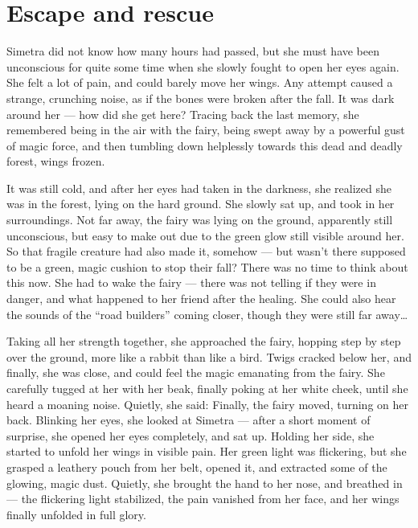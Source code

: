 \chapter{Escape and rescue}
\label{cha:escape-rescue}
Simetra did not know how many hours had passed, but she must have been unconscious for quite some time when she slowly fought to open her eyes again.
She felt a lot of pain, and could barely move her wings. Any attempt caused a strange, crunching noise, as if the bones were broken after the fall. It was dark around her --- how did she get here? Tracing back the last memory, she remembered being in the air with the fairy, being swept away by a powerful gust of magic force, and then tumbling down helplessly towards this dead and deadly forest, wings frozen.

It was still cold, and after her eyes had taken in the darkness, she realized she was in the forest, lying on the hard ground. She slowly sat up, and took in her surroundings. Not far away, the fairy was lying on the ground, apparently still unconscious, but easy to make out due to the green glow still visible around her. So that fragile creature had also made it, somehow --- but wasn't there supposed to be a green, magic cushion to stop their fall?
There was no time to think about this now. She had to wake the fairy --- there was not telling if they were in danger, and what happened to her friend after the healing. She could also hear the sounds of the \enquote{road builders} coming closer, though they were still far away\dots{}

Taking all her strength together, she approached the fairy, hopping step by step over the ground, more like a rabbit than like a bird. Twigs cracked below her, and finally, she was close, and could feel the magic emanating from the fairy. She carefully tugged at her with her beak, finally poking at her white cheek, until she heard a moaning noise. Quietly, she said:  Finally, the fairy moved, turning on her back. Blinking her eyes, she looked at Simetra --- after a short moment of surprise, she opened her eyes completely, and sat up. Holding her side, she started to unfold her wings in visible pain. Her green light was flickering, but she grasped a leathery pouch from her belt, opened it, and extracted some of the glowing, magic dust. Quietly, she brought the hand to her nose, and breathed in --- the flickering light stabilized, the pain vanished from her face, and her wings finally unfolded in full glory.

